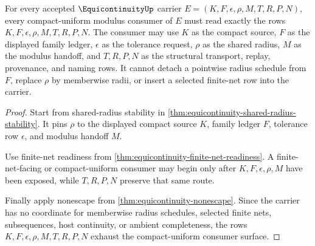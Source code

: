 \begin{theorem}
\label{thm:equicontinuity-family-modulus-consumer-exhaustion}
For every accepted $\EquicontinuityUp$ carrier $E=(K,F,\epsilon,\rho,M,T,R,P,N)$, every compact-uniform modulus consumer of $E$ must read exactly the rows $K,F,\epsilon,\rho,M,T,R,P,N$. The consumer may use $K$ as the compact source, $F$ as the displayed family ledger, $\epsilon$ as the tolerance request, $\rho$ as the shared radius, $M$ as the modulus handoff, and $T,R,P,N$ as the structural transport, replay, provenance, and naming rows. It cannot detach a pointwise radius schedule from $F$, replace $\rho$ by memberwise radii, or insert a selected finite-net row into the carrier.
\end{theorem}
\begin{proof}
Start from shared-radius stability in \autoref{thm:equicontinuity-shared-radius-stability}. It pins $\rho$ to the displayed compact source $K$, family ledger $F$, tolerance row $\epsilon$, and modulus handoff $M$.

Use finite-net readiness from \autoref{thm:equicontinuity-finite-net-readiness}. A finite-net-facing or compact-uniform consumer may begin only after $K,F,\epsilon,\rho,M$ have been exposed, while $T,R,P,N$ preserve that same route.

Finally apply nonescape from \autoref{thm:equicontinuity-nonescape}. Since the carrier has no coordinate for memberwise radius schedules, selected finite nets, subsequences, host continuity, or ambient completeness, the rows $K,F,\epsilon,\rho,M,T,R,P,N$ exhaust the compact-uniform consumer surface.
\end{proof}

